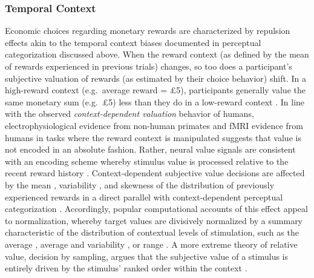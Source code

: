 \documentclass[a4paper, nobind]{templates/ociamthesis}
\begin{document}
\hypertarget{temporal-context-1}{%
\subsubsection{Temporal Context}\label{temporal-context-1}}

Economic choices regarding monetary rewards are characterized by repulsion effects akin to the temporal context biases documented in perceptual categorization discussed above. When the reward context (as defined by the mean of rewards experienced in previous trials) changes, so too does a participant's subjective valuation of rewards (as estimated by their choice behavior) shift. In a high-reward context (e.g.~average reward = £5), participants generally value the same monetary sum (e.g.~£5) less than they do in a low-reward context \autocite[e.g.~when average reward = £3,][]{rigoli2016}. In line with the observed \emph{context-dependent valuation} behavior of humans, electrophysiological evidence from non-human primates \autocite{tremblay1999,padoa-schioppa2009} and fMRI evidence from humans \autocite{cox2014} in tasks where the reward context is manipulated suggests that value is not encoded in an absolute fashion. Rather, neural value signals are consistent with an encoding scheme whereby stimulus value is processed relative to the recent reward history \autocite{rangel2012}. Context-dependent subjective value decisions are affected by the mean \autocite{rigoli2016}, variability \autocite{rigoli2016}, and skewness \autocite{stewart2006} of the distribution of previously experienced rewards in a direct parallel with context-dependent perceptual categorization \autocite{parducci1965}. Accordingly, popular computational accounts of this effect appeal to normalization, whereby target values are divisively normalized by a summary characteristic of the distribution of contextual levels of stimulation, such as the average \autocite[as in divisive normalization,][]{louie2013}, average and variability \autocite[as in the logistic model of subjective value,][]{rigoli2019}, or range \autocite[as in range normalization,][]{padoa-schioppa2009}. A more extreme theory of relative value, decision by sampling, argues that the subjective value of a stimulus is entirely driven by the stimulus' ranked order within the context \autocite{stewart2006,heng2020}.
\end{document}
